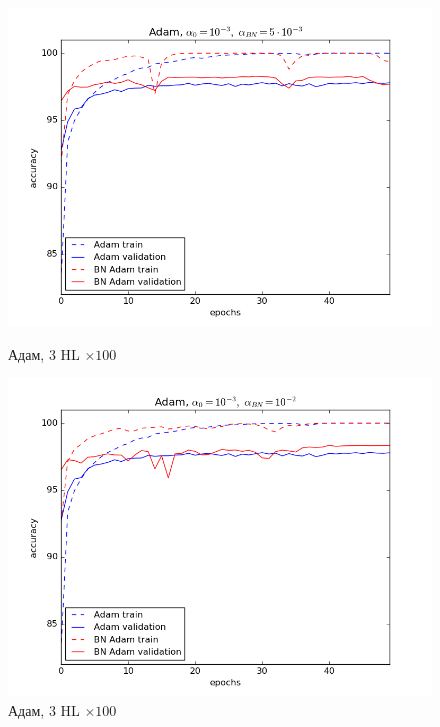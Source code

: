 \documentclass[12pt,oneside]{article}
\begin{document}
\begin{figure}[h!]
\begin{minipage}{0.45\textwidth}
\includegraphics[scale=0.45]{images/mnistAdam2.png}
\caption{\small Адам, $3$ HL $\times 100$}
\end{minipage} \hfill
\begin{minipage}{0.45\textwidth}
\includegraphics[scale=0.45]{images/mnistAdam3.png}
\caption{\small Адам, $3$ HL $\times 100$}
\end{minipage}
\end{figure}

\newpage
\end{document}
